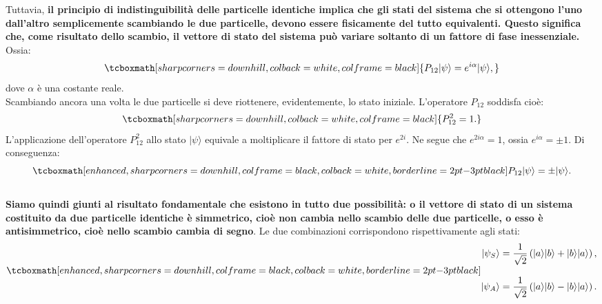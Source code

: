 \documentclass[a4paper,12pt,oneside]{book}
\begin{document}
Tuttavia, \textbf{il principio di indistinguibilità delle particelle identiche implica che gli stati del sistema che si ottengono l'uno dall'altro semplicemente scambiando le due particelle, devono essere fisicamente del tutto equivalenti. Questo significa che, come risultato dello scambio, il vettore di stato del sistema può variare soltanto di un fattore di fase inessenziale.} Ossia:
	\begin{equation}
		\tcboxmath[sharp corners=downhill, colback=white, colframe=black]{
			P_{12}|\psi\rangle =  e^{i\alpha}|\psi\rangle,
			}
	\end{equation}
dove $\alpha$ è una costante reale.\\

Scambiando ancora una volta le due particelle si deve riottenere, evidentemente, lo stato iniziale. L'operatore $P_{12}$ soddisfa cioè:
	\begin{equation}
		\tcboxmath[sharp corners=downhill, colback=white, colframe=black]{
			P_{12}^2 = 1.
			}
	\end{equation}
L'applicazione dell'operatore $P_{12}^2$ allo stato $|\psi\rangle$ equivale a moltiplicare il fattore di stato per $e^{2i}$. Ne segue che $e^{2i\alpha} = 1 $, ossia $e^{i\alpha}=\pm1$. Di conseguenza:
	\begin{equation}
		\tcboxmath[enhanced, sharp corners=downhill, colframe=black, colback=white, borderline={2pt}{-3pt}{black}]{
			P_{12} |\psi\rangle= \pm |\psi\rangle .
			}
	\end{equation}\\
	
\textbf{Siamo quindi giunti al risultato fondamentale che esistono in tutto due possibilità: o il vettore di stato di un sistema costituito da due particelle identiche è simmetrico, cioè non cambia nello scambio delle due particelle, o esso è antisimmetrico, cioè nello scambio cambia di segno}. Le due combinazioni corrispondono rispettivamente agli stati:
	\begin{equation}
	\label{eq:cap20_4}
		\tcboxmath[enhanced, sharp corners=downhill, colframe=black, colback=white, borderline={2pt}{-3pt}{black}]{
		\begin{aligned}
			|\psi _S\rangle= \frac{1}{\sqrt{2}}\left(|a\rangle |b\rangle + |b\rangle|a\rangle \right) , \\[0.3cm]
			|\psi _A\rangle= \frac{1}{\sqrt{2}}\left(|a\rangle |b\rangle - |b\rangle|a\rangle \right). 
		\end{aligned}		
		}
	\end{equation}\\
	
\end{document}
